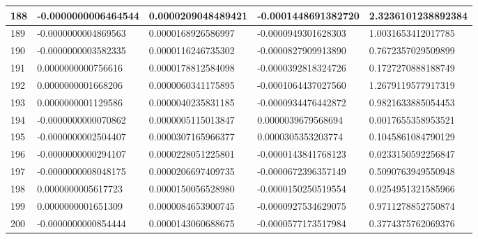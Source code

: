 \begin{center}
\begin{longtable}{|p{0.5cm}|p{3.5cm}|p{3.5cm}|p{3.5cm}|p{3.5cm}|}
\hline
188  & -0.0000000006464544  & 0.0000209048489421  & -0.0001448691382720  & 2.3236101238892384\\
\hline
189  & -0.0000000004869563  & 0.0000168926586997  & -0.0000949301628303  & 1.0031653412017785\\
\hline
190  & -0.0000000003582335  & 0.0000116246735302  & -0.0000827909913890  & 0.7672357029509899\\
\hline
191  & 0.0000000000756616  & 0.0000178812584098  & -0.0000392818324726  & 0.1727270888188749\\
\hline
192  & 0.0000000001668206  & 0.0000060341175895  & -0.0001064437027560  & 1.2679119577917319\\
\hline
193  & 0.0000000001129586  & 0.0000040235831185  & -0.0000934476442872  & 0.9821633885054453\\
\hline
194  & -0.0000000000070862  & 0.0000005115013847  & 0.0000039679568694  & 0.0017655358953521\\
\hline
195  & -0.0000000002504407  & 0.0000307165966377  & 0.0000305353203774  & 0.1045861084790129\\
\hline
196  & -0.0000000000294107  & 0.0000228051225801  & -0.0000143841768123  & 0.0233150592256847\\
\hline
197  & -0.0000000008048175  & 0.0000206697409735  & -0.0000672396357149  & 0.5090763949550948\\
\hline
198  & 0.0000000005617723  & 0.0000150056528980  & -0.0000150250519554  & 0.0254951321585966\\
\hline
199  & 0.0000000001651309  & 0.0000084653900745  & -0.0000927534629075  & 0.9711278852750874\\
\hline
200  & -0.0000000000854444  & 0.0000143060688675  & -0.0000577173517984  & 0.3774375762069376\\
\hline
\end{longtable}
\end{center}
